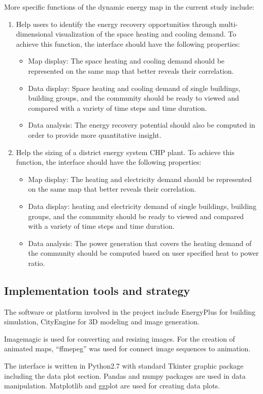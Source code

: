 More specific functions of the dynamic energy map in the current study
include:
\begin{enumerate}[1).]
  
\item Help users to identify the energy recovery opportunities
  through multi-dimensional visualization of the space heating and
  cooling demand. To achieve this function, the interface should have
  the following properties:
  \begin{itemize}
  \item Map display: The space heating and cooling demand should
    be represented on the same map that better reveals their
    correlation.
  \item Data display: Space heating and cooling demand of single
    buildings, building groups, and the community should be ready to
    viewed and compared with a variety of time steps and time
    duration.
  \item Data analysis: The energy recovery potential should also be
    computed in order to provide more quantitative insight.
  \end{itemize}

\item Help the sizing of a district energy system CHP plant. To
  achieve this function, the interface should have the following
  properties:
  \begin{itemize}
  \item Map display: The heating and electricity demand should
    be represented on the same map that better reveals their
    correlation.
  \item Data display: heating and electricity demand of single
    buildings, building groups, and the community should be ready to
    viewed and compared with a variety of time steps and time
    duration.
  \item Data analysis: The power generation that covers the heating
    demand of the community should be computed based on user specified
    heat to power ratio.
  \end{itemize}
\end{enumerate}

\subsection {Implementation tools and strategy}
The software or platform involved in the project include EnergyPlus
for building simulation, CityEngine for 3D modeling and image
generation. 

Imagemagic is used for converting and resizing images. For the
creation of animated maps, ``ffmepeg'' was used for connect image
sequences to animation.

The interface is written in Python2.7 with standard Tkinter graphic
package including the data plot section. Pandas and numpy packages are
used in data manipulation. Matplotlib and ggplot are used for creating
data plots.
